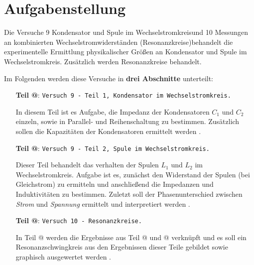 \documentclass[10pt,a4paper]{article}
\makeatletter
\newcommand*{\rom}[1]{\expandafter\@slowromancap\romannumeral #1@}
\makeatother
\begin{document}
\newpage

\tableofcontents

\vspace{10pt}

\section{Aufgabenstellung}
\begin{flushleft}
Die Versuche 9 \glqq Kondensator und Spule im Wechselstromkreis\grqq und 10 \glqq Messungen an kombinierten Wechselstromwiderständen (Resonanzkreise)\grqq behandelt die experimentelle Ermittlung physikalischer Größen an Kondensator und Spule im Wechselstromkreis. Zusätzlich werden Resonanzkreise behandelt.

Im Folgenden werden diese Versuche in \textbf{drei Abschnitte} unterteilt:

\begin{itemize}
\item[\textbf{Teil \rom{1}}:] \texttt{Versuch 9 - Teil 1, Kondensator im Wechselstromkreis.}

In diesem Teil ist es Aufgabe, die Impedanz der Kondensatoren $C_1$ und $C_2$ einzeln, sowie in Parallel- und Reihenschaltung zu bestimmen. Zusätzlich sollen die Kapazitäten der Kondensatoren ermittelt werden \cite{vers9}.

\item[\textbf{Teil \rom{2}}:] \texttt{Versuch 9 - Teil 2, Spule im Wechselstromkreis.}

Dieser Teil behandelt das verhalten der Spulen $L_1$ und $L_2$ im Wechselstromkreis. Aufgabe ist es, zunächst den Widerstand der Spulen (bei Gleichstrom) zu ermitteln und anschließend die Impedanzen und Induktivitäten zu bestimmen. Zuletzt soll der Phasenunterschied zwischen \textit{Strom} und \textit{Spannung} ermittelt und interpretiert werden \cite{vers9}.

\item[\textbf{Teil \rom{3}}:] \texttt{Versuch 10 - Resonanzkreise.}

In Teil \rom{3} werden die Ergebnisse aus Teil \rom{1} und \rom{2} verknüpft und es soll ein Resonanzschwingkreis aus den Ergebnissen dieser Teile gebildet sowie graphisch ausgewertet werden \cite{vers10}.
\end{itemize}
\end{flushleft}
\end{document}
